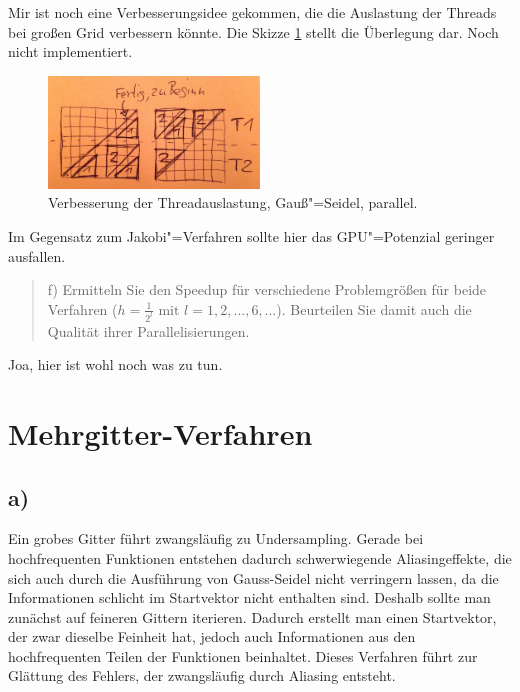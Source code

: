 \documentclass[paper = a4]{scrartcl}
\begin{document}
Mir ist noch eine Verbesserungsidee gekommen, die die Auslastung der Threads bei großen Grid verbessern könnte. Die Skizze \ref{fig:gaussseideldreiecke} stellt die Überlegung dar. Noch nicht implementiert.

\begin{figure}
    \centering
    \includegraphics[width=0.5\textwidth]{gaussseideldreiecke}
    \caption{Verbesserung der Threadauslastung, Gauß"=Seidel, parallel.}
    \label{fig:gaussseideldreiecke}
\end{figure}

Im Gegensatz zum Jakobi"=Verfahren sollte hier das GPU"=Potenzial geringer ausfallen.

\begin{quote}
    f) Ermitteln Sie den Speedup für verschiedene Problemgrößen für beide Verfahren (\(h = \frac{1}{2^l} \text{ mit } l = 1, 2, \dots, 6, \dots\)). Beurteilen Sie damit auch die Qualität ihrer Parallelisierungen.
\end{quote}

Joa, hier ist wohl noch was zu tun.


\section{Mehrgitter-Verfahren}

\subsection*{a)}
Ein grobes Gitter führt zwangsläufig zu Undersampling. Gerade bei hochfrequenten Funktionen entstehen dadurch schwerwiegende Aliasingeffekte, die sich auch durch die Ausführung von Gauss-Seidel nicht verringern lassen, da die Informationen schlicht im Startvektor nicht enthalten sind. Deshalb sollte man zunächst auf feineren Gittern iterieren. Dadurch erstellt man einen Startvektor, der zwar dieselbe Feinheit hat, jedoch auch Informationen aus den hochfrequenten Teilen der Funktionen beinhaltet. Dieses Verfahren führt zur Glättung des Fehlers, der zwangsläufig durch Aliasing entsteht.
\end{document}
